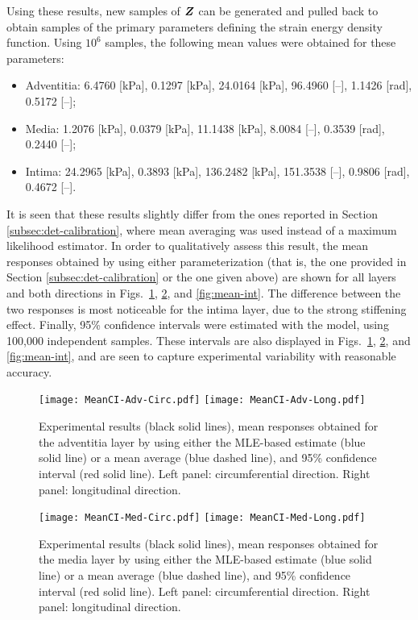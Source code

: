 Using these results, new samples of $\boldsymbol{Z}$ can be generated and pulled back to obtain samples of the primary parameters defining the strain energy density function. Using $10^{6}$ samples, the following mean values were obtained for these parameters:
\begin{itemize}
    \item Adventitia: 6.4760 [kPa], 0.1297 [kPa], 24.0164 [kPa], 96.4960 [--], 1.1426 [rad], 0.5172 [--];
    \item Media: 1.2076 [kPa], 0.0379 [kPa], 11.1438 [kPa], 8.0084 [--], 0.3539 [rad], 0.2440 [--];
    \item Intima: 24.2965 [kPa], 0.3893 [kPa], 136.2482 [kPa], 151.3538 [--], 0.9806 [rad], 0.4672 [--].
\end{itemize}
It is seen that these results slightly differ from the ones reported in Section \ref{subsec:det-calibration}, where mean averaging was used instead of a maximum likelihood estimator. In order to qualitatively assess this result, the mean responses obtained by using either parameterization (that is, the one provided in Section \ref{subsec:det-calibration} or the one given above) are shown for all layers and both directions in Figs.~\ref{fig:mean-adv}, \ref{fig:mean-med}, and \ref{fig:mean-int}. The difference between the two responses is most noticeable for the intima layer, due to the strong stiffening effect. Finally, 95\% confidence intervals were estimated with the model, using 100,000 independent samples. These intervals are also displayed in Figs.~\ref{fig:mean-adv}, \ref{fig:mean-med}, and \ref{fig:mean-int}, and are seen to capture experimental variability with reasonable accuracy.
\begin{figure}[ht!]
    \begin{center}
        \texttt{[image: MeanCI-Adv-Circ.pdf]} \texttt{[image: MeanCI-Adv-Long.pdf]}
    \end{center}
    \caption[Experimental results obtained for the adventitia layer.]{Experimental results (black solid lines), mean responses obtained for the adventitia layer by using either the MLE-based estimate (blue solid line) or a mean average (blue dashed line), and 95\% confidence interval (red solid line). Left panel: circumferential direction. Right panel: longitudinal direction.}
    \label{fig:mean-adv}
\end{figure}
\begin{figure}[ht!]
    \begin{center}
        \texttt{[image: MeanCI-Med-Circ.pdf]} \texttt{[image: MeanCI-Med-Long.pdf]}
    \end{center}
    \caption[Experimental results obtained for the media layer.]{Experimental results (black solid lines), mean responses obtained for the media layer by using either the MLE-based estimate (blue solid line) or a mean average (blue dashed line), and 95\% confidence interval (red solid line). Left panel: circumferential direction. Right panel: longitudinal direction.}
    \label{fig:mean-med}
\end{figure}
